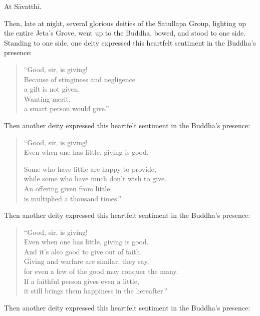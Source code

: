 \documentclass[12pt,openany]{book}%
\begin{document}
At \textsanskrit{Sāvatthī}. 

Then, late at night, several glorious deities of the Satullapa Group, lighting up the entire Jeta’s Grove, went up to the Buddha, bowed, and stood to one side. Standing to one side, one deity expressed this heartfelt sentiment in the Buddha’s presence: 

\begin{verse}%
“Good, sir, is giving! \\
Because of stinginess and negligence \\
a gift is not given. \\
Wanting merit, \\
a smart person would give.” 

%
\end{verse}

Then another deity expressed this heartfelt sentiment in the Buddha’s presence: 

\begin{verse}%
“Good, sir, is giving! \\
Even when one has little, giving is good. 

Some who have little are happy to provide, \\
while some who have much don’t wish to give. \\
An offering given from little \\
is multiplied a thousand times.” 

%
\end{verse}

Then another deity expressed this heartfelt sentiment in the Buddha’s presence: 

\begin{verse}%
“Good, sir, is giving! \\
Even when one has little, giving is good. \\
And it’s also good to give out of faith. \\
Giving and warfare are similar, they say, \\
for even a few of the good may conquer the many. \\
If a faithful person gives even a little, \\
it still brings them happiness in the hereafter.” 

%
\end{verse}

Then another deity expressed this heartfelt sentiment in the Buddha’s presence: 
\end{document}
